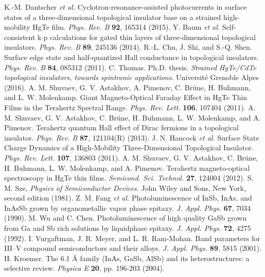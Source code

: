\documentclass[titlepage,a4paper]{book}
\begin{document}
\begin{thebibliography}{199}
K.-M. Dantscher \textit{et al.} Cyclotron-resonance-assisted photocurrents in surface states of a three-dimensional topological insulator base on a strained high-mobility HgTe film. \textit{Phys. Rev. B} \textbf{92}, 165314 (2015).
Y. Baum \textit{et al.} Self-consistent k$\cdot$p calculations for gated thin layers of three-dimensional topological insulators. \textit{Phys. Rev. B} \textbf{89}, 245136 (2014).
R.-L. Chu, J. Shi, and S.-Q. Shen. Surface edge state and half-quantized Hall conductance in topological insulators. \textit{Phys. Rev. B} \textbf{84}, 085312 (2011). 
C. Thomas. Ph.D. thesis. \textit{Strained HgTe/CdTe topological insulators, towards spintronic applications}. Université Grenoble Alpes (2016).  
A. M. Shuvaev, G. V. Astakhov, A. Pimenov, C. Brüne, H. Buhmann, and L. W. Molenkamp. Giant Magneto-Optical Faraday Effect in HgTe Thin Films in the Terahertz Spectral Range. \textit{Phys. Rev. Lett.} \textbf{106}, 107404 (2011).
A. M. Shuvaev, G. V. Astakhov, C. Brüne, H. Buhmann, L. W. Molenkamp, and A. Pimenov. Terahertz quantum Hall effect of Dirac fermions in a topological insulator. \textit{Phys. Rev. B} \textbf{87}, 121104(R) (2013).
J. N. Hancock \textit{et al.} Surface State Charge Dynamics of a High-Mobility Three-Dimensional Topological Insulator. \textit{Phys. Rev. Lett.} \textbf{107}, 136803 (2011).
A. M. Shuvaev, G. V. Astakhov, C. Brüne, H. Buhmann, L. W. Molenkamp, and A. Pimenov. Terahertz magneto-optical spectroscopy in HgTe thin films. \textit{Semicond. Sci. Technol.} \textbf{27}, 124004 (2012).
S. M. Sze, \textit{Physics of Semiconductor Devices.} John Wiley and Sons, New York, second edition (1981).
Z. M. Fang \textit{et al.} Photoluminescence of InSb, InAs, and InAsSb grown by organometallic vapor phase epitaxy. \textit{J. Appl. Phys.} \textbf{67}, 7034 (1990).
M. Wu and C. Chen. Photoluminescence of high quality GaSb grown from Ga and Sb rich solutions by liquidphase epitaxy. \textit{J. Appl. Phys.} \textbf{72}, 4275 (1992).
I. Vurgaftman, J. R. Meyer, and L. R. Ram-Mohan. Band parameters for III–V compound semiconductors and their alloys. \textit{J. Appl. Phys.} \textbf{89}, 5815 (2001).
H. Kroemer. The 6.1 Å family (InAs, GaSb, AlSb) and its heterostructures: a selective review. \textit{Physica E} \textbf{20}, pp. 196-203 (2004). 

\end{thebibliography}
\end{document}
